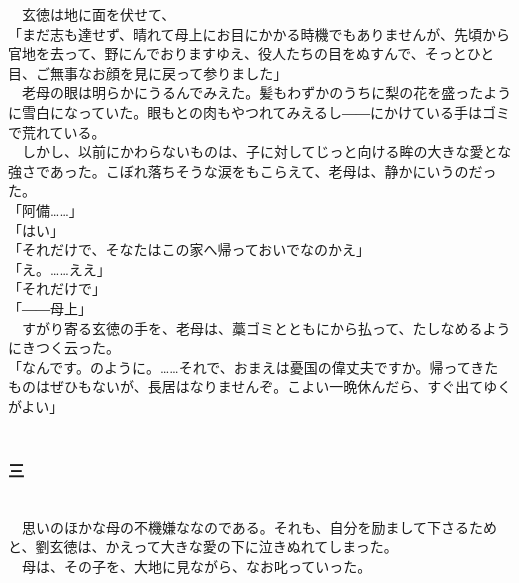 \documentclass[
  paper=a5,
  fontsize=10pt,
  jafontsize=9.5pt,
  tate,                  %
  open_bracket_pos=nibu, %
]{jlreq}
\begin{document}
　玄徳は地に面を伏せて、\\


「まだ志も達せず、晴れて母上にお目にかかる時機でもありませんが、先頃から官地を去って、野にんでおりますゆえ、役人たちの目をぬすんで、そっとひと目、ご無事なお顔を見に戻って参りました」\\


　老母の眼は明らかにうるんでみえた。髪もわずかのうちに梨の花を盛ったように雪白になっていた。眼もとの肉もやつれてみえるし――にかけている手はゴミで荒れている。\\


　しかし、以前にかわらないものは、子に対してじっと向ける眸の大きな愛とな強さであった。こぼれ落ちそうな涙をもこらえて、老母は、静かにいうのだった。\\


「阿備……」\\


「はい」\\


「それだけで、そなたはこの家へ帰っておいでなのかえ」\\


「え。……ええ」\\


「それだけで」\\


「――母上」\\


　すがり寄る玄徳の手を、老母は、藁ゴミとともにから払って、たしなめるようにきつく云った。\\


「なんです。のように。……それで、おまえは憂国の偉丈夫ですか。帰ってきたものはぜひもないが、長居はなりませんぞ。こよい一晩休んだら、すぐ出てゆくがよい」\\

\\

\subsubsection{三}

\\


　思いのほかな母の不機嫌ななのである。それも、自分を励まして下さるためと、劉玄徳は、かえって大きな愛の下に泣きぬれてしまった。\\


　母は、その子を、大地に見ながら、なお叱っていった。\\
\end{document}

